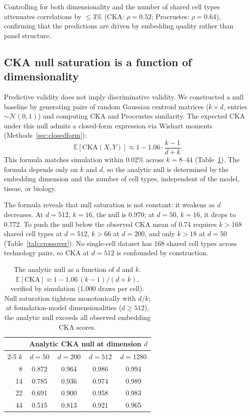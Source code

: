 \documentclass[11pt]{article}
\begin{document}
Controlling for both dimensionality and the number of shared cell types
attenuates correlations by $\leq 3\%$ (CKA: $\rho = 0.52$; Procrustes:
$\rho = 0.64$), confirming that the predictions are driven by embedding
quality rather than panel structure.


\subsection{CKA null saturation is a function of dimensionality}
\label{sec:nullfloor}

Predictive validity does not imply discriminative validity. We
constructed a null baseline by generating pairs of random Gaussian
centroid matrices ($k \times d$, entries $\sim \mathcal{N}(0,1)$) and
computing CKA and Procrustes similarity. The expected CKA under this
null admits a closed-form expression via Wishart moments
(Methods~\ref{sec:closedform}):
\begin{equation}
\label{eq:cka_null}
\mathbb{E}[\mathrm{CKA}(X, Y)] \approx 1 - 1.06 \cdot \frac{k-1}{d+k}
\end{equation}
This formula matches simulation within 0.02\% across $k = 8$--$44$
(Table~\ref{tab:nullfloor}). The formula depends only on $k$ and $d$,
so the analytic null is determined by the embedding dimension and the
number of cell types, independent of the model, tissue, or biology.

The formula reveals that null saturation is not constant: it weakens
as $d$ decreases. At $d = 512$, $k = 16$, the null is 0.970; at
$d = 50$, $k = 16$, it drops to 0.772. To push the null below the
observed CKA mean of 0.74 requires $k > 168$ shared cell types at
$d = 512$, $k > 66$ at $d = 200$, and only $k > 18$ at $d = 50$
(Table~\ref{tab:crossover}). No single-cell dataset has 168 shared cell
types across technology pairs, so CKA at $d = 512$ is confounded by
construction.

\medskip
\begin{table}[t]
\centering
\caption{The analytic null as a function of $d$ and $k$.
$\mathbb{E}[\mathrm{CKA}] \approx 1 - 1.06\,(k{-}1)/(d{+}k)$,
verified by simulation (1,000 draws per cell). Null saturation tightens
monotonically with $d/k$; at foundation-model dimensionalities
($d \geq 512$), the analytic null exceeds all observed embedding CKA scores.}
\label{tab:nullfloor}
\small
\begin{tabular}{@{}rcccc@{}}
\toprule
& \multicolumn{4}{c}{Analytic CKA null at dimension $d$} \\
\cmidrule(lr){2-5}
$k$ & $d = 50$ & $d = 200$ & $d = 512$ & $d = 1280$ \\
\midrule
8  & 0.872 & 0.964 & 0.986 & 0.994 \\
14 & 0.785 & 0.936 & 0.974 & 0.989 \\
22 & 0.691 & 0.900 & 0.958 & 0.983 \\
44 & 0.515 & 0.813 & 0.921 & 0.965 \\
\bottomrule
\end{tabular}
\end{table}
\end{document}
